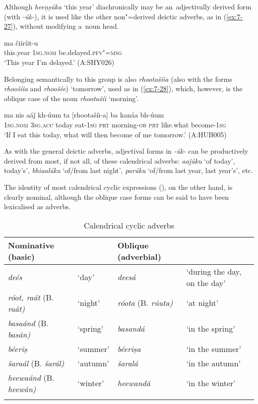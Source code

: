 Although \textit{heeṇṣúka} `this year' diachronically may be an~adjectivally derived form (with \textit{-úk-}), it is used like the other non"=derived deictic adverbs, as in (\ref{ex:7-27}), without modifying a~noun head. 

\begin{exe}
\ex
\label{ex:7-27}
\gll [heeṇṣúka] ma čiiríit-u \\
this.year  \textsc{1sg.nom}  be.delayed.\textsc{pfv"=msg} \\
\glt `This year I'm delayed.' (A:SHY026)
\end{exe}

Belonging semantically to this group is also \textit{rhootašíia} (also with the forms \textit{rhoošíia} and \textit{rhoošée}) `tomorrow', used as in (\ref{ex:7-28}), which, however, is the oblique case of the noun \textit{rhootašíi} `morning'.

\begin{exe}
\ex
\label{ex:7-28}
\gll ma nis aáǰ kh-úum ta [rhootašíi-a] ba  kanáa bh-úum \\
\textsc{1sg.nom} \textsc{3sg.acc} today eat-\textsc{1sg} \textsc{prt} morning-\textsc{ob} \textsc{prt} like.what become-\textsc{1sg}\\
\glt `If I eat this today, what will then become of me tomorrow.' (A:HUB005)
\end{exe}

As with the general deictic adverbs, adjectival forms in \textit{-úk-} can be productively derived from most, if not all, of these calendrical adverbs: \textit{aaǰúku} `of today', today's', \textit{bhiaalúku} `of/from last night', \textit{parúku} `of/from last year, last year's', etc. 


The identity of most calendrical cyclic expressions (), on the other hand, is clearly nominal, although the oblique case forms can be said to have been lexicalised as adverbs. 


\begin{table}[ht]
\caption{Calendrical cyclic adverbs}
\begin{tabularx}{\textwidth}{ Q l l Q }
\lsptoprule
Nominative (basic) &
&
Oblique (adverbial) &
\\\hline
\textit{deés} &
`day' &
\textit{deesá} &
`during the day, on the day'\\
\textit{róot, raát} (B. \textit{raát)} &
`night' &
\textit{róota} (B. \textit{rúuta)} &
`at night'\\
\textit{basaánd} (B. \textit{basán)} &
`spring' &
\textit{basandá} &
`in the spring'\\
\textit{béeriṣ} &
`summer' &
\textit{béeriṣa} &
`in the summer'\\
\textit{šaraál} (B. \textit{šarál)} &
`autumn' &
\textit{šaralá} &
`in the autumn'\\
\textit{heewaánd} (B. \textit{heewán)} &
`winter' &
\textit{heewandá} &
`in the winter'\\\lspbottomrule
\end{tabularx}
\label{tab:7-2}
\end{table}


